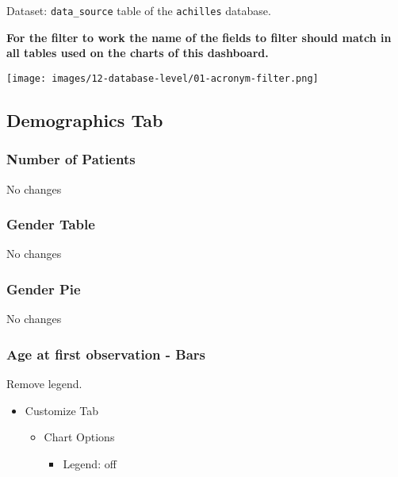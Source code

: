 \documentclass[
]{book}
\providecommand{\tightlist}{%
  \setlength{\itemsep}{0pt}\setlength{\parskip}{0pt}}
\begin{document}
Dataset: \texttt{data\_source} table of the \texttt{achilles} database.

\textbf{For the filter to work the name of the fields to filter should match in all tables used on the charts of this dashboard.}

\texttt{[image: images/12-database-level/01-acronym-filter.png]}

\hypertarget{demographics-tab-1}{%
\subsection*{Demographics Tab}\label{demographics-tab-1}}

\hypertarget{number-of-patients-1}{%
\subsubsection*{Number of Patients}\label{number-of-patients-1}}

No changes

\hypertarget{gender-table-1}{%
\subsubsection*{Gender Table}\label{gender-table-1}}

No changes

\hypertarget{gender-pie-1}{%
\subsubsection*{Gender Pie}\label{gender-pie-1}}

No changes

\hypertarget{age-at-first-observation---bars}{%
\subsubsection*{Age at first observation - Bars}\label{age-at-first-observation---bars}}

Remove legend.

\begin{itemize}
\tightlist
\item
  Customize Tab

  \begin{itemize}
  \tightlist
  \item
    Chart Options

    \begin{itemize}
    \tightlist
    \item
      Legend: off
    \end{itemize}
  \end{itemize}
\end{itemize}
\end{document}
